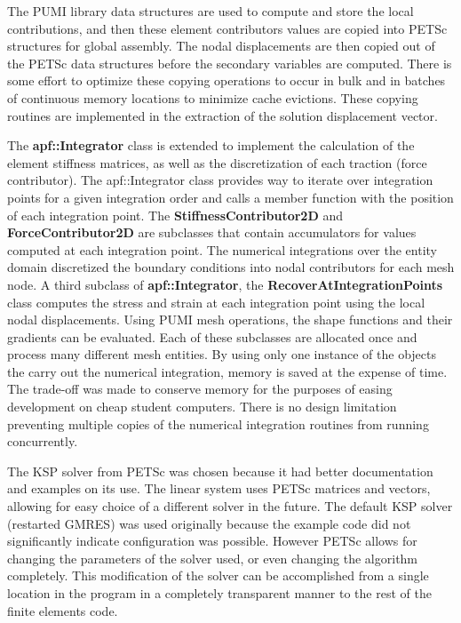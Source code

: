 \documentclass{article}
\begin{document}
The PUMI library data structures are used to compute and store the local contributions, and then these element contributors values are copied into PETSc structures for global assembly. The nodal displacements are then copied out of the PETSc data structures before the secondary variables are computed. There is some effort to optimize these copying operations to occur in bulk and in batches of continuous memory locations to minimize cache evictions. These copying routines are implemented in the extraction of the solution displacement vector.

The \textbf{apf::Integrator} class is extended to implement the calculation of the element stiffness matrices, as well as the discretization of each traction (force contributor). The apf::Integrator class provides way to iterate over integration points for a given integration order and calls a member function with the position of each integration point. The \textbf{StiffnessContributor2D} and \textbf{ForceContributor2D} are subclasses that contain accumulators for values computed at each integration point. The numerical integrations over the entity domain discretized the boundary conditions into nodal contributors for each mesh node. A third subclass of \textbf{apf::Integrator}, the \textbf{RecoverAtIntegrationPoints} class computes the stress and strain at each integration point using the local nodal displacements. Using PUMI mesh operations, the shape functions and their gradients can be evaluated. Each of these subclasses are allocated once and process many different mesh entities. By using only one instance of the objects the carry out the numerical integration, memory is saved at the expense of time. The trade-off was made to conserve memory for the purposes of easing development on cheap student computers. There is no design limitation preventing multiple copies of the numerical integration routines from running concurrently.

The KSP solver from PETSc was chosen because it had better documentation and examples on its use. The linear system uses PETSc matrices and vectors, allowing for easy choice of a different solver in the future. The default KSP solver (restarted GMRES) was used originally because the example code did not significantly indicate configuration was possible. However PETSc allows for changing the parameters of the solver used, or even changing the algorithm completely. This modification of the solver can be accomplished from a single location in the program in a completely transparent manner to the rest of the finite elements code.
\end{document}
